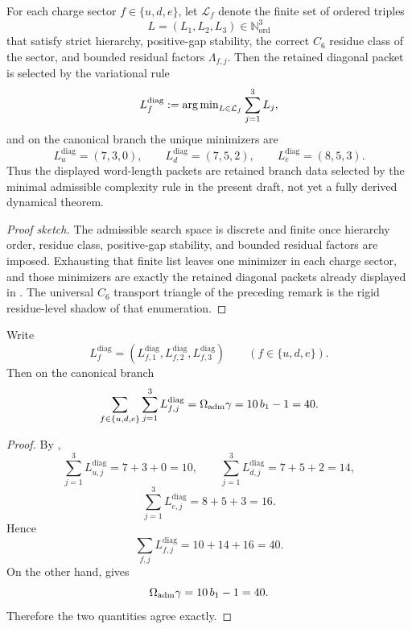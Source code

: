 \begin{principle}
\label{prin:minimal-admissible-transport-packets}
For each charge sector $f\in\{u,d,e\}$, let $\mathcal L_f$ denote the finite set of ordered triples
\[
L=(L_1,L_2,L_3)\in\mathbb N_{\mathrm{ord}}^3
\]
that satisfy strict hierarchy, positive-gap stability, the correct $C_6$ residue class of the sector, and bounded residual factors $\Lambda_{f,j}$. Then the retained diagonal packet is selected by the variational rule
\[
L_f^{\mathrm{diag}}
:=
\operatorname{arg\,min}_{L\in\mathcal L_f}\sum_{j=1}^3 L_j,
\]
and on the canonical branch the unique minimizers are
\[
L_u^{\mathrm{diag}}=(7,3,0),
\qquad
L_d^{\mathrm{diag}}=(7,5,2),
\qquad
L_e^{\mathrm{diag}}=(8,5,3).
\]
Thus the displayed word-length packets are retained branch data selected by the
minimal admissible complexity rule in the present draft, not yet a fully derived
dynamical theorem.
\end{principle}

\begin{proof}[Proof sketch]
The admissible search space is discrete and finite once hierarchy order, residue class, positive-gap stability, and bounded residual factors are imposed. Exhausting that finite list leaves one minimizer in each charge sector, and those minimizers are exactly the retained diagonal packets already displayed in . The universal $C_6$ transport triangle of the preceding remark is the rigid residue-level shadow of that enumeration.
\end{proof}

\begin{corollary}
\label{cor:transport-length-sum-rule}
Write
\[
L_f^{\mathrm{diag}}=(L_{f,1}^{\mathrm{diag}},L_{f,2}^{\mathrm{diag}},L_{f,3}^{\mathrm{diag}})
\qquad
(f\in\{u,d,e\}).
\]
Then on the canonical branch
\[
\sum_{f\in\{u,d,e\}}\sum_{j=1}^{3}L_{f,j}^{\mathrm{diag}}
=
\Omega_{\mathrm{adm}}\gamma
=
10\,b_1-1
=
40.
\]
\end{corollary}

\begin{proof}
By ,
\[
\sum_{j=1}^3L_{u,j}^{\mathrm{diag}}=7+3+0=10,
\qquad
\sum_{j=1}^3L_{d,j}^{\mathrm{diag}}=7+5+2=14,
\]
\[
\sum_{j=1}^3L_{e,j}^{\mathrm{diag}}=8+5+3=16.
\]
Hence
\[
\sum_{f,j}L_{f,j}^{\mathrm{diag}}=10+14+16=40.
\]
On the other hand,  gives
\[
\Omega_{\mathrm{adm}}\gamma=10\,b_1-1=40.
\]
Therefore the two quantities agree exactly.
\end{proof}

